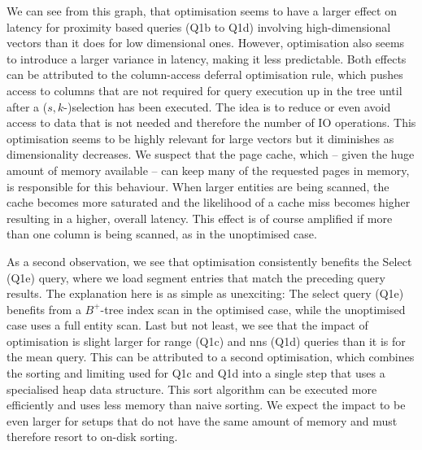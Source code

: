 We can see from this graph, that optimisation seems to have a larger effect on latency for proximity based queries (Q1b to Q1d) involving high-dimensional vectors than it does for low dimensional ones. However, optimisation also seems to introduce a larger variance in latency, making it less predictable. Both effects can be attributed to the column-access deferral optimisation rule, which pushes access to columns that are not required for query execution up in the tree until after a ($s,k$-)selection has been executed. The idea is to reduce or even avoid access to data that is not needed and therefore the number of IO operations. This optimisation seems to be highly relevant for large vectors but it diminishes as dimensionality decreases. We suspect that the page cache, which -- given the huge amount of memory available -- can keep many of the requested pages in memory, is responsible for this behaviour. When larger entities are being scanned, the cache becomes more saturated and the likelihood of a cache miss becomes higher resulting in a higher, overall latency. This effect is of course amplified if more than one column is being scanned, as in the unoptimised case.

As a second observation, we see that optimisation consistently benefits the Select (Q1e) query, where we load segment entries that match the preceding query results. The explanation here is as simple as unexciting: The select query (Q1e) benefits from a $B^{+}$-tree index scan in the optimised case, while the unoptimised case uses a full entity scan. Last but not least, we see that the impact of optimisation is slight larger for range (Q1c) and \acrshort{nns} (Q1d) queries than it is for the mean query. This can be attributed to a second optimisation, which combines the sorting and limiting used for Q1c and Q1d into a single step that uses a specialised heap data structure. This sort algorithm can be executed more efficiently and uses less memory than naive sorting. We expect the impact to be even larger for setups that do not have the same amount of memory and must therefore resort to on-disk sorting.

\newpage

